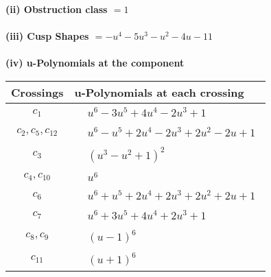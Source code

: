 \documentclass[1p]{elsarticle_modified}
\theoremstyle{definition}
\begin{document}
\flushleft \textbf{(ii) Obstruction class $= 1$}\\~\\
\flushleft \textbf{(iii) Cusp Shapes $= - u^4-5 u^3- u^2-4 u-11$}\\~\\
\newpage\renewcommand{\arraystretch}{1}
\flushleft \textbf{(iv) u-Polynomials at the component}\newline \\
\begin{tabular}{m{50pt}|m{274pt}}
Crossings & \hspace{64pt}u-Polynomials at each crossing \\
\hline $$\begin{aligned}c_{1}\end{aligned}$$&$\begin{aligned}
&u^6-3 u^5+4 u^4-2 u^3+1
\end{aligned}$\\
\hline $$\begin{aligned}c_{2},c_{5},c_{12}\end{aligned}$$&$\begin{aligned}
&u^6- u^5+2 u^4-2 u^3+2 u^2-2 u+1
\end{aligned}$\\
\hline $$\begin{aligned}c_{3}\end{aligned}$$&$\begin{aligned}
&(u^3- u^2+1)^2
\end{aligned}$\\
\hline $$\begin{aligned}c_{4},c_{10}\end{aligned}$$&$\begin{aligned}
&u^6
\end{aligned}$\\
\hline $$\begin{aligned}c_{6}\end{aligned}$$&$\begin{aligned}
&u^6+u^5+2 u^4+2 u^3+2 u^2+2 u+1
\end{aligned}$\\
\hline $$\begin{aligned}c_{7}\end{aligned}$$&$\begin{aligned}
&u^6+3 u^5+4 u^4+2 u^3+1
\end{aligned}$\\
\hline $$\begin{aligned}c_{8},c_{9}\end{aligned}$$&$\begin{aligned}
&(u-1)^6
\end{aligned}$\\
\hline $$\begin{aligned}c_{11}\end{aligned}$$&$\begin{aligned}
&(u+1)^6
\end{aligned}$\\
\hline
\end{tabular}\\~\\
\end{document}
